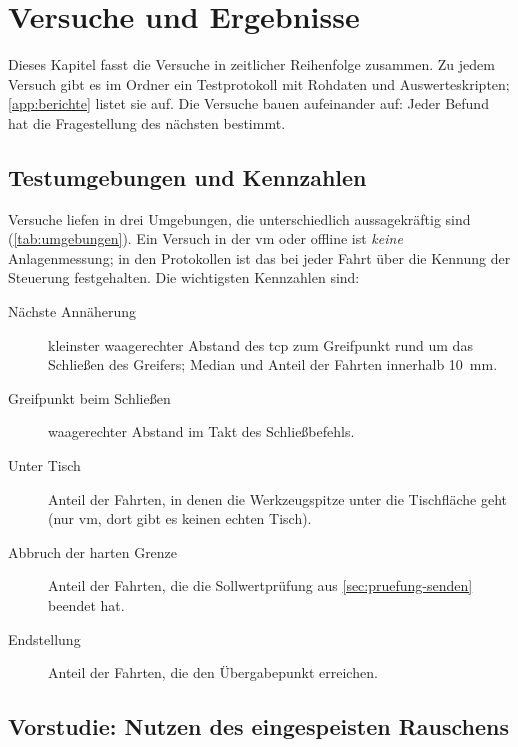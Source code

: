 \chapter{Versuche und Ergebnisse}
\label{ch:versuche}

Dieses Kapitel fasst die Versuche in zeitlicher Reihenfolge zusammen. Zu jedem Versuch gibt
es im Ordner  ein Testprotokoll mit Rohdaten und Auswerteskripten;
\cref{app:berichte} listet sie auf. Die Versuche bauen aufeinander auf: Jeder Befund hat die
Fragestellung des nächsten bestimmt.

\section{Testumgebungen und Kennzahlen}
\label{sec:kennzahlen}

Versuche liefen in drei Umgebungen, die unterschiedlich aussagekräftig sind
(\cref{tab:umgebungen}). Ein Versuch in der \ac{vm} oder offline ist \emph{keine}
Anlagenmessung; in den Protokollen ist das bei jeder Fahrt über die Kennung der Steuerung
festgehalten. Die wichtigsten Kennzahlen sind:

\begin{description}
  \item[Nächste Annäherung] kleinster waagerechter Abstand des \ac{tcp} zum Greifpunkt rund um
    das Schließen des Greifers; Median und Anteil der Fahrten innerhalb \SI{10}{\milli\metre}.
  \item[Greifpunkt beim Schließen] waagerechter Abstand im Takt des Schließbefehls.
  \item[Unter Tisch] Anteil der Fahrten, in denen die Werkzeugspitze unter die Tischfläche
    geht (nur \ac{vm}, dort gibt es keinen echten Tisch).
  \item[Abbruch der harten Grenze] Anteil der Fahrten, die die Sollwertprüfung aus
    \cref{sec:pruefung-senden} beendet hat.
  \item[Endstellung] Anteil der Fahrten, die den Übergabepunkt erreichen.
\end{description}

\section{Vorstudie: Nutzen des eingespeisten Rauschens}
\label{sec:rauschstudie}

